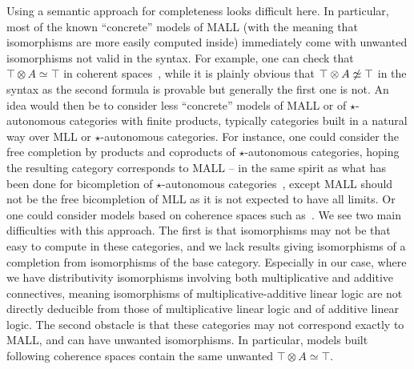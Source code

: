 \documentclass{lmcs}
\newcommand*{\tens}{\otimes} %
\newcommand*{\iso}{\mathrel{\simeq}} %
\begin{document}
Using a semantic approach for completeness looks difficult here.
In particular, most of the known ``concrete'' models of MALL (with the meaning that isomorphisms are more easily computed inside) immediately come with unwanted isomorphisms not valid in the syntax.
For example, one can check that $\top \tens A \iso \top$ in coherent spaces~\cite{ll}, while it is plainly obvious that $\top \tens A \not\iso \top$ in the syntax as the second formula is provable but generally the first one is not.
An idea would then be to consider less ``concrete'' models of MALL or of $\star$-autonomous categories with finite products, typically categories built in a natural way over MLL or $\star$-autonomous categories.
For instance, one could consider the free completion by products and coproducts of $\star$-autonomous categories, hoping the resulting category corresponds to MALL -- in the same spirit as what has been done for bicompletion of $\star$-autonomous categories~\cite{freebicompletion1,freebicompletion2}, except MALL should not be the free bicompletion of MLL as it is not expected to have all limits.
Or one could consider models based on coherence spaces such as~\cite{coherencecompletion1,coherencecompletion2,hypercoherencecompletenessmall}.
We see two main difficulties with this approach.
The first is that isomorphisms may not be that easy to compute in these categories, and we lack results giving isomorphisms of a completion from isomorphisms of the base category.
Especially in our case, where we have distributivity isomorphisms involving both multiplicative and additive connectives, meaning isomorphisms of multiplicative-additive linear logic are not directly deducible from those of multiplicative linear logic and of additive linear logic.
The second obstacle is that these categories may not correspond exactly to MALL, and can have unwanted isomorphisms.
In particular, models built following coherence spaces contain the same unwanted $\top \tens A \iso \top$.
\end{document}
